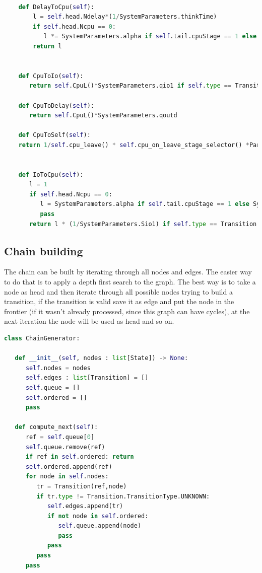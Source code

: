 \documentclass[12pt,a4paper]{article}
\begin{document}
    \begin{lstlisting}[language=python]

    def DelayToCpu(self):
        l = self.head.Ndelay*(1/SystemParameters.thinkTime)
        if self.head.Ncpu == 0:
           l *= SystemParameters.alpha if self.tail.cpuStage == 1 else  SystemParameters.beta
        return l
        

    def CpuToIo(self):      
       return self.CpuL()*SystemParameters.qio1 if self.type == Transition.TransitionType.CPU_TO_IO1 else self.CpuL()*SystemParameters.qio2
        
    def CpuToDelay(self):
       return self.CpuL()*SystemParameters.qoutd
        
    def CpuToSelf(self):
    return 1/self.cpu_leave() * self.cpu_on_leave_stage_selector() *Params.qouts + 1/Params.timeSlice*self.cpu_on_leave_stage_selector()*self.cpu_on_arrive_stage_selector()

        
    def IoToCpu(self):
       l = 1
       if self.head.Ncpu == 0:
          l = SystemParameters.alpha if self.tail.cpuStage == 1 else SystemParameters.beta
          pass
       return l * (1/SystemParameters.Sio1) if self.type == Transition.TransitionType.IO1_TO_CPU else l* (1/SystemParameters.Sio2)
        \end{lstlisting}


\subsection{Chain building}
The chain can be built by iterating through all nodes and edges. The easier way to do that is to apply a depth first search to the graph. The best way is to take a node as head and then iterate through all possible nodes trying to build a transition, if the transition is valid save it as edge and put the node in the frontier (if it wasn't already processed, since this graph can have cycles), at the next iteration the node will be used as head and so on. 
\begin{lstlisting}[language=python]
class ChainGenerator:
   
   def __init__(self, nodes : list[State]) -> None:
      self.nodes = nodes
      self.edges : list[Transition] = []
      self.queue = []
      self.ordered = []   
      pass

   def compute_next(self):
      ref = self.queue[0]
      self.queue.remove(ref)
      if ref in self.ordered: return
      self.ordered.append(ref)
      for node in self.nodes:
         tr = Transition(ref,node)
         if tr.type != Transition.TransitionType.UNKNOWN:
            self.edges.append(tr)
            if not node in self.ordered:
               self.queue.append(node)
               pass
            pass
         pass
      pass
\end{lstlisting}
\end{document}
